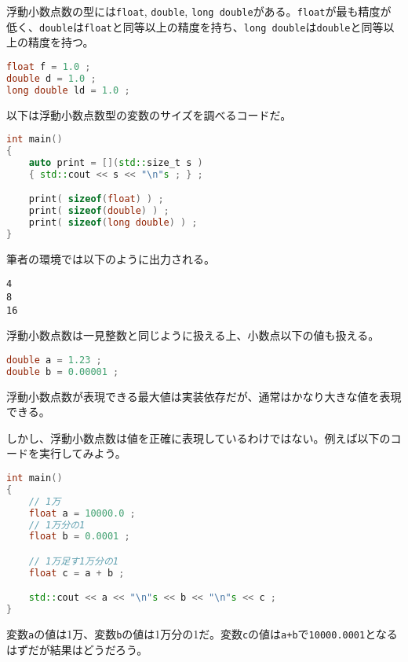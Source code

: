 
浮動小数点数の型には\texttt{float}, \texttt{double}, \texttt{long double}がある。\texttt{float}が最も精度が低く、\texttt{double}は\texttt{float}と同等以上の精度を持ち、\texttt{long double}は\texttt{double}と同等以上の精度を持つ。

\begin{lstlisting}[language={C++}]
float f = 1.0 ;
double d = 1.0 ;
long double ld = 1.0 ;
\end{lstlisting}

以下は浮動小数点数型の変数のサイズを調べるコードだ。

\begin{lstlisting}[language={C++}]
int main()
{
    auto print = [](std::size_t s )
    { std::cout << s << "\n"s ; } ;

    print( sizeof(float) ) ;
    print( sizeof(double) ) ;
    print( sizeof(long double) ) ;
}
\end{lstlisting}

筆者の環境では以下のように出力される。

\begin{lstlisting}[style=terminal]
4
8
16
\end{lstlisting}

浮動小数点数は一見整数と同じように扱える上、小数点以下の値も扱える。

\begin{lstlisting}[language={C++}]
double a = 1.23 ;
double b = 0.00001 ;
\end{lstlisting}

浮動小数点数が表現できる最大値は実装依存だが、通常はかなり大きな値を表現できる。

しかし、浮動小数点数は値を正確に表現しているわけではない。例えば以下のコードを実行してみよう。

\begin{lstlisting}[language={C++}]
int main()
{
    // 1万
    float a = 10000.0 ;
    // 1万分の1
    float b = 0.0001 ;

    // 1万足す1万分の1
    float c = a + b ;

    std::cout << a << "\n"s << b << "\n"s << c ;
}
\end{lstlisting}

変数\texttt{a}の値は1万、変数\texttt{b}の値は1万分の1だ。変数\texttt{c}の値は\texttt{a+b}で\texttt{10000.0001}となるはずだが結果はどうだろう。

